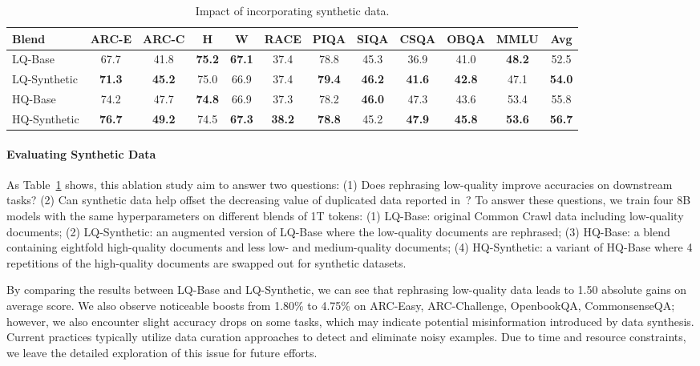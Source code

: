 \documentclass[11pt]{article}
\begin{document}
\begin{table}[!hbt]
\small
\centering
\begin{tabularx}{\textwidth}{Xccccccccccc}
\toprule
\textbf{Blend}              & \textbf{ARC-E}         & \textbf{ARC-C}         & \textbf{H}     & \textbf{W}    & \textbf{RACE}          & \textbf{PIQA}          & \textbf{SIQA}    & \textbf{CSQA} & \textbf{OBQA}    & \textbf{MMLU}          & \textbf{Avg}       \\

\midrule
LQ-Base & 67.7 & 41.8 & \textbf{75.2} & \textbf{67.1} & 37.4 & 78.8 & 45.3 & 36.9 & 41.0 & \textbf{48.2} & 52.5 \\
LQ-Synthetic & \textbf{71.3} & \textbf{45.2} & 75.0 & 66.9 & 37.4 & \textbf{79.4} & \textbf{46.2} & \textbf{41.6} & \textbf{42.8} & 47.1 & \textbf{54.0} \\
\midrule
HQ-Base  & 74.2 & 47.7 & \textbf{74.8} & 66.9 & 37.3 & 78.2 & \textbf{46.0} & 47.3 & 43.6 & 53.4 & 55.8 \\
HQ-Synthetic  & \textbf{76.7} & \textbf{49.2} & 74.5 & \textbf{67.3} & \textbf{38.2} & \textbf{78.8} & 45.2 & \textbf{47.9} & \textbf{45.8} & \textbf{53.6} & \textbf{56.7} \\
\bottomrule
\end{tabularx}
\caption{Impact of incorporating synthetic data.}
\label{table:synthetic_data_ablation}
\end{table}


\paragraph{Evaluating Synthetic Data} 
As Table~\ref{table:synthetic_data_ablation} shows, this ablation study aim to answer two questions:
(1) Does rephrasing low-quality improve accuracies on downstream tasks?
(2) Can synthetic data help offset the decreasing value of duplicated data reported in~\citep{muennighoff2024scaling}?
To answer these questions, we train four 8B models with the same hyperparameters on different blends of 1T tokens:
(1) LQ-Base: original Common Crawl data including low-quality documents;
(2) LQ-Synthetic: an augmented version of LQ-Base where the low-quality documents are rephrased;
(3) HQ-Base: a blend containing eightfold high-quality documents and less low- and medium-quality documents;
(4) HQ-Synthetic: a variant of HQ-Base where 4 repetitions of the high-quality documents are swapped out for synthetic datasets.

By comparing the results between LQ-Base and LQ-Synthetic, we can see that rephrasing low-quality data leads to 1.50 absolute gains on average score. We also observe noticeable boosts from 1.80\% to 4.75\% on ARC-Easy, ARC-Challenge, OpenbookQA, CommonsenseQA; however, we also encounter slight accuracy drops on some tasks, which may indicate potential misinformation introduced by data synthesis.
Current practices typically utilize data curation approaches to detect and eliminate noisy examples. Due to time and resource constraints, we leave the detailed exploration of this issue for future efforts.
\end{document}
